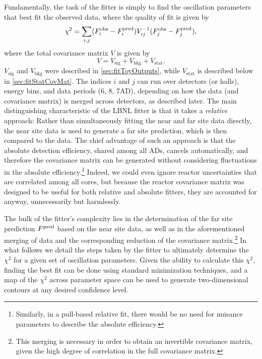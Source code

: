 \documentclass[../thesis.tex]{subfiles}
\begin{document}
Fundamentally, the task of the fitter is simply to find the oscillation parameters that best fit the observed data, where the quality of fit is given by
\begin{equation*}
  \chi^2 = \sum_{i,j} (F^{\mathrm{obs}}_i - F^{\mathrm{pred}}_i) V^{-1}_{ij} (F^{\mathrm{obs}}_j - F^{\mathrm{pred}}_j),
\end{equation*}
where the total covariance matrix $V$ is given by
\begin{equation*}
  V = V_{\mathrm{sig}} + V_{\mathrm{bkg}} + V_{\mathrm{stat}}.
\end{equation*}
$V_{\mathrm{sig}}$ and $V_{\mathrm{bkg}}$ were described in \autoref{sec:fitToyOutputs}, while $V_{\mathrm{stat}}$ is described below in \autoref{sec:fitStatCovMat}. The indices $i$ and $j$ can run over detectors (or halls), energy bins, and data periods (6, 8, 7AD), depending on how the data (and covariance matrix) is merged across detectors, as described later. The main distinguishing characteristic of the LBNL fitter is that it takes a \emph{relative} approach: Rather than simultaneously fitting the near and far site data directly, the near site data is used to generate a far site prediction, which is then compared to the data. The chief advantage of such an approach is that the absolute detection efficiency, shared among all ADs, cancels automatically, and therefore the covariance matrix can be generated without considering fluctuations in the absolute efficiency.\footnote{Similarly, in a pull-based relative fit, there would be no need for nuisance parameters to describe the absolute efficiency.} Indeed, we could even ignore reactor uncertainties that are correlated among all cores, but because the reactor covariance matrix was designed to be useful for both relative and absolute fitters, they are accounted for anyway, unnecessarily but harmlessly.

The bulk of the fitter's complexity lies in the determination of the far site prediction $F^{\mathrm{pred}}$ based on the near site data, as well as in the aforementioned merging of data and the corresponding reduction of the covariance matrix.\footnote{This merging is necessary in order to obtain an invertible covariance matrix, given the high degree of correlation in the full covariance matrix.} In what follows we detail the steps taken by the fitter to ultimately determine the $\chi^2$ for a given set of oscillation parameters. Given the ability to calculate this $\chi^2$, finding the best fit can be done using standard minimization techniques, and a map of the $\chi^2$ across parameter space can be used to generate two-dimensional contours at any desired confidence level.
\end{document}
